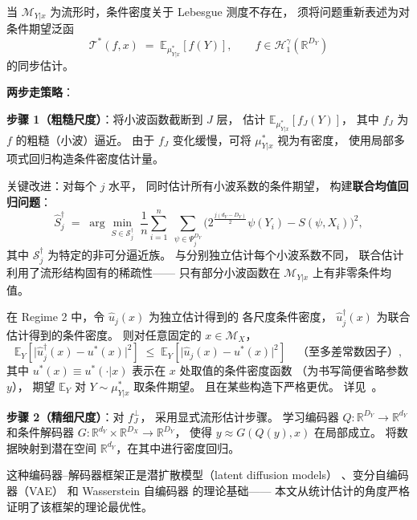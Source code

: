 当 $\mathcal{M}_{Y|x}$ 为流形时，条件密度关于 Lebesgue 测度不存在，
须将问题重新表述为对条件期望泛函
\[
    \mathcal{T}^*(f, x) \;=\; \mathbb{E}_{\mu^*_{Y|x}}[f(Y)],
    \qquad f \in \mathcal{H}_1^\gamma(\mathbb{R}^{D_Y})
\]
的同步估计。

\textbf{两步走策略}：

\textbf{步骤 1（粗糙尺度）}：将小波函数截断到 $J$ 层，
估计 $\mathbb{E}_{\mu^*_{Y|x}}[f_J(Y)]$，
其中 $f_J$ 为 $f$ 的粗糙（小波）逼近。
由于 $f_J$ 变化缓慢，可将 $\mu^*_{Y|x}$ 视为有密度，
使用局部多项式回归构造条件密度估计量。

关键改进：对每个 $j$ 水平，
同时估计所有小波系数的条件期望，
构建\textbf{联合均值回归问题}：
\begin{equation}\label{eq:joint-mean-regression}
    \widehat{S}_j^\dagger
    \;=\;
    \arg\min_{S \in \mathcal{S}_j^\dagger}\;
    \frac{1}{n}\sum_{i=1}^{n}\;\sum_{\psi \in \Psi_j^{D_Y}}
    \Big(
        2^{\frac{j(d_Y - D_Y)}{2}}\psi(Y_i)
        - S(\psi, X_i)
    \Big)^2,
\end{equation}
其中 $\mathcal{S}_j^\dagger$ 为特定的非可分逼近族。
与分别独立估计每个小波系数不同，
联合估计利用了流形结构固有的稀疏性——
只有部分小波函数在 $\mathcal{M}_{Y|x}$ 上有非零条件均值。

\begin{Lemma}[联合 vs 独立估计的最优性]\label{def:lem-joint-vs-separate}
    在 Regime 2 中，令 $\widehat{u}_j(x)$ 为独立估计得到的
    各尺度条件密度，
    $\widehat{u}_j^\dagger(x)$ 为联合估计得到的条件密度。
    则对任意固定的 $x \in \mathcal{M}_X$，
    \[
        \mathbb{E}_Y\!\left[
            \big|\widehat{u}_j^\dagger(x) - u^*(x)\big|^2
        \right]
        \;\leq\;
        \mathbb{E}_Y\!\left[
            \big|\widehat{u}_j(x) - u^*(x)\big|^2
        \right]
        \quad \text{（至多差常数因子）},
    \]
    其中 $u^*(x) \equiv u^*(\cdot|x)$ 表示在 $x$ 处取值的条件密度函数
    （为书写简便省略参数 $y$），
    期望 $\mathbb{E}_Y$ 对 $Y \sim \mu^*_{Y|x}$ 取条件期望。
    且在某些构造下严格更优。
    详见~\citep[Appendix B.2.3]{tang2025regression}。
\end{Lemma}

\textbf{步骤 2（精细尺度）}：对 $f_J^\perp$，
采用显式流形估计步骤。
学习编码器 $Q: \mathbb{R}^{D_Y} \to \mathbb{R}^{d_Y}$
和条件解码器 $G: \mathbb{R}^{d_Y} \times \mathbb{R}^{D_X} \to \mathbb{R}^{D_Y}$，
使得 $y \approx G(Q(y), x)$ 在局部成立。
将数据映射到潜在空间 $\mathbb{R}^{d_Y}$，在其中进行密度回归。

\begin{Remark}\label{rem:encoder-decoder}
    这种编码器--解码器框架正是潜扩散模型（latent diffusion models）
    \citep{Rombach2022}、变分自编码器（VAE）\citep{Kingma2013}
    和 Wasserstein 自编码器\citep{Tolstikhin2017} 的理论基础——
    本文从统计估计的角度严格证明了该框架的理论最优性。
\end{Remark}

